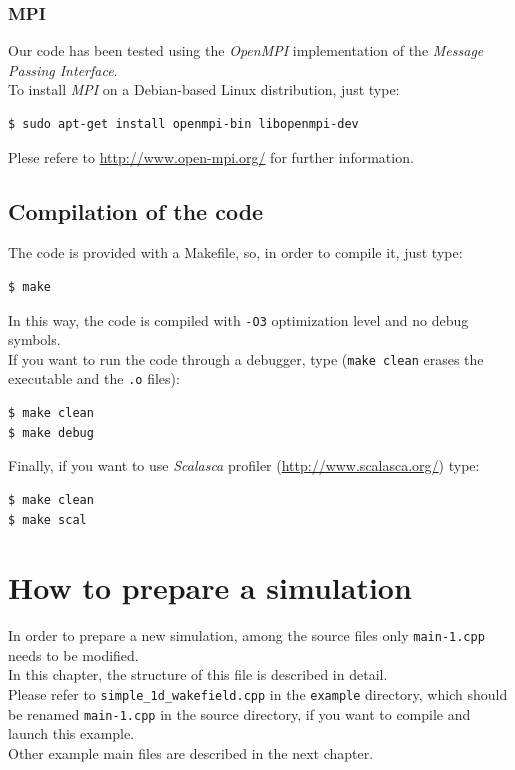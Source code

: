 \documentclass[11pt,a4paper]{report}
\begin{document}
\subsection{MPI}
Our code has been tested using the \emph{OpenMPI} implementation of the \emph{Message Passing Interface}. \\
To install \emph{MPI} on a Debian-based Linux distribution, just type: 
\begin{verbatim}
$ sudo apt-get install openmpi-bin libopenmpi-dev
\end{verbatim}
Plese refere to \url{http://www.open-mpi.org/} for further information.
\section{Compilation of the code}
The code is provided with a Makefile, so, in order to compile it, just type:
\begin{verbatim}
$ make
\end{verbatim}
In this way, the code is compiled with \verb+-O3+ optimization level and no debug symbols.\\
If you want to run the code through a debugger, type (\verb+make clean+ erases the executable and the \verb+.o+ files):
\begin{verbatim}
$ make clean
$ make debug
\end{verbatim}
Finally, if you want to use \emph{Scalasca} profiler (\url{http://www.scalasca.org/}) type:
\begin{verbatim}
$ make clean
$ make scal
\end{verbatim}

\chapter{How to prepare a simulation}
In order to prepare a new simulation, among the source files only \verb+main-1.cpp+ needs to be modified.\\
In this chapter, the structure of this file is described in detail.\\
Please refer to \verb+simple_1d_wakefield.cpp+ in the \verb+example+ directory, which should be renamed \verb+main-1.cpp+ in the source directory, if you want to compile and launch this example. \\
Other example main files are described in the next chapter.
\end{document}

